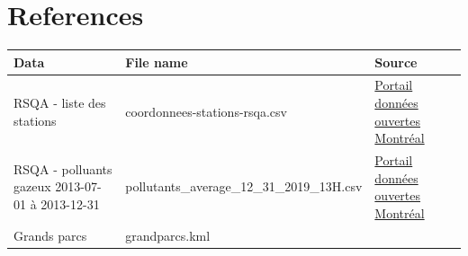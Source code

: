 \documentclass[]{book}
\theoremstyle{definition}
\theoremstyle{definition}
\theoremstyle{definition}
\theoremstyle{remark}
\begin{document}
\chapter{References}\label{references}

\begin{longtable}[]{@{}lll@{}}
\toprule
\begin{minipage}[b]{0.08\columnwidth}\raggedright\strut
Data\strut
\end{minipage} & \begin{minipage}[b]{0.16\columnwidth}\raggedright\strut
File name\strut
\end{minipage} & \begin{minipage}[b]{0.10\columnwidth}\raggedright\strut
Source\strut
\end{minipage}\tabularnewline
\midrule
\endhead
\begin{minipage}[t]{0.08\columnwidth}\raggedright\strut
RSQA - liste des stations\strut
\end{minipage} & \begin{minipage}[t]{0.16\columnwidth}\raggedright\strut
coordonnees-stations-rsqa.csv\strut
\end{minipage} & \begin{minipage}[t]{0.10\columnwidth}\raggedright\strut
\href{http://donnees.ville.montreal.qc.ca/dataset/rsqa-liste-des-stations/resource/29db5545-89a4-4e4a-9e95-05aa6dc2fd80}{Portail
données ouvertes Montréal}\strut
\end{minipage}\tabularnewline
\begin{minipage}[t]{0.08\columnwidth}\raggedright\strut
RSQA - polluants gazeux 2013-07-01 à 2013-12-31\strut
\end{minipage} & \begin{minipage}[t]{0.16\columnwidth}\raggedright\strut
pollutants\_average\_12\_31\_2019\_13H.csv\strut
\end{minipage} & \begin{minipage}[t]{0.10\columnwidth}\raggedright\strut
\href{http://donnees.ville.montreal.qc.ca/dataset/rsqa-polluants-gazeux/resource/26ddbd0b-47f6-4039-98b2-b32568ed01b1}{Portail
données ouvertes Montréal}\strut
\end{minipage}\tabularnewline
\begin{minipage}[t]{0.08\columnwidth}\raggedright\strut
Grands parcs\strut
\end{minipage} & \begin{minipage}[t]{0.16\columnwidth}\raggedright\strut
grandparcs.kml\strut
\end{minipage} & \begin{minipage}[t]{0.10\columnwidth}\raggedright\strut

\end{minipage}
\end{longtable}
\end{document}
